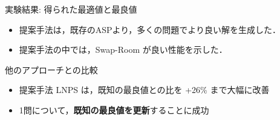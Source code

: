 \documentclass[11pt,dvipdfmx]{beamer}
\begin{document}
\begin{frame}{実験結果: 得られた最適値と最良値}
  \begin{tableA}
    
  \end{tableA}
  \begin{itemize}
  \item 提案手法は，既存のASPより，多くの問題でより良い解を生成した．
  \item 提案手法の中では，\textsf{Swap-Room} が良い性能を示した．
  \end{itemize}
\end{frame}
\begin{frame}{他のアプローチとの比較}
  \begin{center}
  \begin{tableB}
    
  \end{tableB}
  \end{center}
  \begin{itemize}
      \item 提案手法 LNPS は，既知の最良値との比を +26\% まで大幅に改善
      \item 1問について，\alert{\bf 既知の最良値を更新}することに成功
  \end{itemize}
\end{frame}
\end{document}
